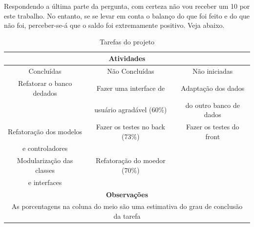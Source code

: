 Respondendo a última parte da pergunta, com certeza não vou receber um 10 por este trabalho. No entanto, se se levar
em conta o balanço do que foi feito e do que não foi, perceber-se-á que o saldo foi extremamente positivo. Veja abaixo.

\begin{table}[h]
    \centering
    \begin{tabular}{|c|c|c|}
        \hline
        \multicolumn{3}{|c|}{Atividades} \\ \hline\hline
        Concluídas & Não Concluídas & Não iniciadas \\ \hline
        Refatorar o banco dedados & Fazer uma interface de  & Adaptação dos dados \\
        & usuário agradável (60\%) & do outro banco de dados \\ \hline
        Refatoração dos modelos  & Fazer os testes no back (73\%) & Fazer os testes do front \\
        e controladores & & \\ \hline
        Modularização das classes & Refatoração do moedor (70\%) & \\
        e interfaces  & & \\ \hline\hline
        \multicolumn{3}{|c|}{\textbf{Observações}} \\ \hline
        \multicolumn{3}{|c|}{As porcentagens na coluna do meio são uma estimativa do grau de conclusão da tarefa} \\ \hline
    \end{tabular}
    \caption{Tarefas do projeto}
    \label{table:activity}
\end{table}